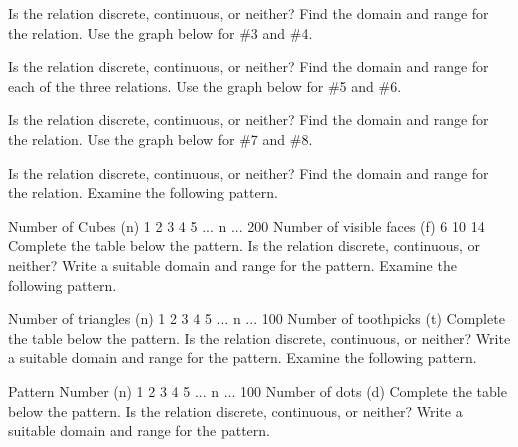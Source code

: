 \documentclass{ximera}
\begin{document}
 

Is the relation discrete, continuous, or neither?
Find the domain and range for the relation.
Use the graph below for \#3 and \#4.

 

Is the relation discrete, continuous, or neither?
Find the domain and range for each of the three relations.
Use the graph below for \#5 and \#6.

 

Is the relation discrete, continuous, or neither?
Find the domain and range for the relation.
Use the graph below for \#7 and \#8.

 

Is the relation discrete, continuous, or neither?
Find the domain and range for the relation.
Examine the following pattern.

 

Number of Cubes (n)	1	2	3	4	5	...	n	...	200
Number of visible faces (f)	6	10	14	 	 	 	 	 	 
Complete the table below the pattern.
Is the relation discrete, continuous, or neither?
Write a suitable domain and range for the pattern.
Examine the following pattern.

 

Number of triangles (n)	1	2	3	4	5	...	n	...	100
Number of toothpicks (t)	 	 	 	 	 	 	 	 	 
Complete the table below the pattern.
Is the relation discrete, continuous, or neither?
Write a suitable domain and range for the pattern.
Examine the following pattern.

 

Pattern Number (n)	1	2	3	4	5	...	n	...	100
Number of dots (d)	 	 	 	 	 	 	 	 	 
Complete the table below the pattern.
Is the relation discrete, continuous, or neither?
Write a suitable domain and range for the pattern.
\end{document}
